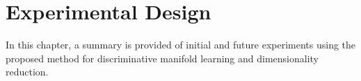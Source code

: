 \chapter{Experimental Design}
In this chapter, a summary is provided of initial and future experiments using the proposed method for discriminative manifold learning and dimensionality reduction. 

\cite{Wei2016ImageBagGenerators}